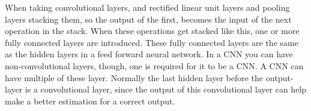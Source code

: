 When taking convolutional layers, and rectified linear unit layers and pooling layers stacking them, so the output of the first, becomes the input of the next operation in the stack. When these operations get stacked like this, one or more fully connected layers are introduced. These fully connected layers are the same as the hidden layers in a feed forward neural network. In a CNN you can have non-convolutional layers, though, one is required for it to be a CNN. A CNN can have multiple of these layer. Normally the last hidden layer before the output-layer is a convolutional layer, since the output of this convolutional layer can help make a better estimation for a correct output.